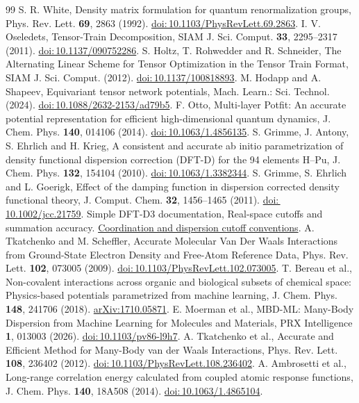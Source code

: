 \documentclass[11pt,a4paper]{article}
\newcommand{\doi}[1]{\href{https://doi.org/#1}{doi:\,#1}}\newcommand{\pg}{\clearpage}
\begin{document}
\begin{thebibliography}{99}
 S. R. White, Density matrix formulation for quantum renormalization groups, Phys. Rev. Lett. \textbf{69}, 2863 (1992). \doi{10.1103/PhysRevLett.69.2863}.
 I. V. Oseledets, Tensor-Train Decomposition, SIAM J. Sci. Comput. \textbf{33}, 2295--2317 (2011). \doi{10.1137/090752286}.
 S. Holtz, T. Rohwedder and R. Schneider, The Alternating Linear Scheme for Tensor Optimization in the Tensor Train Format, SIAM J. Sci. Comput. (2012). \doi{10.1137/100818893}.
 M. Hodapp and A. Shapeev, Equivariant tensor network potentials, Mach. Learn.: Sci. Technol. (2024). \doi{10.1088/2632-2153/ad79b5}.
 F. Otto, Multi-layer Potfit: An accurate potential representation for efficient high-dimensional quantum dynamics, J. Chem. Phys. \textbf{140}, 014106 (2014). \doi{10.1063/1.4856135}.
 S. Grimme, J. Antony, S. Ehrlich and H. Krieg, A consistent and accurate ab initio parametrization of density functional dispersion correction (DFT-D) for the 94 elements H--Pu, J. Chem. Phys. \textbf{132}, 154104 (2010). \doi{10.1063/1.3382344}.
 S. Grimme, S. Ehrlich and L. Goerigk, Effect of the damping function in dispersion corrected density functional theory, J. Comput. Chem. \textbf{32}, 1456--1465 (2011). \doi{10.1002/jcc.21759}.
 Simple DFT-D3 documentation, Real-space cutoffs and summation accuracy. \href{https://dftd3.readthedocs.io/en/latest/guide/accuracy.html}{Coordination and dispersion cutoff conventions}.
 A. Tkatchenko and M. Scheffler, Accurate Molecular Van Der Waals Interactions from Ground-State Electron Density and Free-Atom Reference Data, Phys. Rev. Lett. \textbf{102}, 073005 (2009). \doi{10.1103/PhysRevLett.102.073005}.
 T. Bereau et al., Non-covalent interactions across organic and biological subsets of chemical space: Physics-based potentials parametrized from machine learning, J. Chem. Phys. \textbf{148}, 241706 (2018). \href{https://arxiv.org/abs/1710.05871}{arXiv:1710.05871}.
 E. Moerman et al., MBD-ML: Many-Body Dispersion from Machine Learning for Molecules and Materials, PRX Intelligence \textbf{1}, 013003 (2026). \doi{10.1103/pv86-l9h7}.
 A. Tkatchenko et al., Accurate and Efficient Method for Many-Body van der Waals Interactions, Phys. Rev. Lett. \textbf{108}, 236402 (2012). \doi{10.1103/PhysRevLett.108.236402}.
 A. Ambrosetti et al., Long-range correlation energy calculated from coupled atomic response functions, J. Chem. Phys. \textbf{140}, 18A508 (2014). \doi{10.1063/1.4865104}.

\end{thebibliography}
\end{document}
